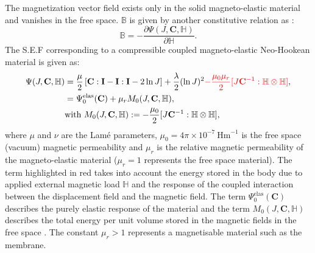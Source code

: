The magnetization vector field exists only in the solid magneto-elastic material and vanishes in the free space. $\mathbb{B}$ is given by another constitutive relation as \cite{dorfmann2004}: 
\begin{equation}
\mathbb{B} = -\dfrac{\partial \Psi (J, \mathbf{C}, \mathbb{H})}{\partial \mathbb{H}}.
\label{eq:3.4}
\end{equation}
The S.E.F corresponding to a compressible coupled magneto-elastic Neo-Hookean material is given as: 
\begin{align}
\Psi (J, \mathbf{C}, \mathbb{H}) &= \dfrac{\mu}{2} \left[ \mathbf{C} : \mathbf{I} - \mathbf{I} : \mathbf{I} -2 \ln J \right] + \dfrac{\lambda}{2} (\ln J)^2 \textcolor{red}{- \frac{\mu_0 \mu_r}{2} [J \mathbf{C}^{-1} : \mathbb{H} \otimes \mathbb{H}]}, \\
&= \Psi_0^{\text{elas}} (\mathbf{C}) + \mu_r M_0 (J, \mathbf{C}, \mathbb{H}), \\
& \text{with} \ M_0 (J, \mathbf{C}, \mathbb{H}) := -\frac{\mu_0}{2} [J \mathbf{C}^{-1} : \mathbb{H} \otimes \mathbb{H}],
\label{eq:3.5}
\end{align}
where $\mu$ and $\nu$ are the Lam\'e parameters, $\mu_0 = 4 \pi \times 10^{-7} \ \text{Hm}^{-1}$ is the free space (vacuum) magnetic permeability and $\mu_r$ is the relative magnetic permeability of the magneto-elastic material ($\mu_r = 1$ represents the free space material). The term highlighted in red takes into account the energy stored in the body due to applied external magnetic load $\mathbb{H}$ and the response of the coupled interaction between the displacement field and the magnetic field. The term $\Psi_0^{\text{elas}} (\mathbf{C})$ describes the purely elastic response of the material and the term $M_0 (J, \mathbf{C}, \mathbb{H})$ describes the total energy per unit volume stored in the magnetic fields in the free space \cite{dorfmann2004}. The constant $\mu_r > 1$ represents a magnetisable material such as the membrane. \par 

